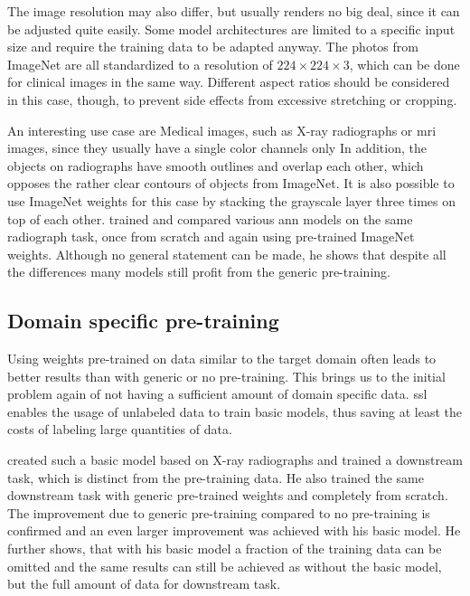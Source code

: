 The image resolution may also differ, but usually renders no big deal, since it can be adjusted quite easily. 
Some model architectures are limited to a specific input size and require the training data to be adapted anyway.
The photos from ImageNet are all standardized to a resolution of $224 \times 224 \times 3$, which can be done for clinical images in the same way.
Different aspect ratios should be considered in this case, though, to prevent side effects from excessive stretching or cropping.

An interesting use case are Medical images, such as X-ray radiographs or \gls{mri} images, since they usually have a single color channels only
In addition, the objects on radiographs have smooth outlines and overlap each other, which opposes the rather clear contours of objects from ImageNet. 
It is also possible to use ImageNet weights for this case by stacking the grayscale layer three times on top of each other.
\autocite{ke2021} trained and compared various \gls{ann} models on the same radiograph task, once from scratch and again using pre-trained ImageNet weights.
Although no general statement can be made, he shows that despite all the differences many models still profit from the generic pre-training.

\subsection{Domain specific pre-training}

Using weights pre-trained on data similar to the target domain often leads to better results than with generic or no pre-training.
This brings us to the initial problem again of not having a sufficient amount of domain specific data.
\gls{ssl} enables the usage of unlabeled data to train basic models, thus saving at least the costs of labeling large quantities of data.

\autocite{cho2023} created such a basic model based on X-ray radiographs and trained a downstream task, which is distinct from the pre-training data.
He also trained the same downstream task with generic pre-trained weights and completely from scratch.
The improvement due to generic pre-training compared to no pre-training is confirmed and an even larger improvement was achieved with his basic model.
He further shows, that with his basic model a fraction of the training data can be omitted and the same results can still be achieved as without the basic model, but the full amount of data for downstream task. 

